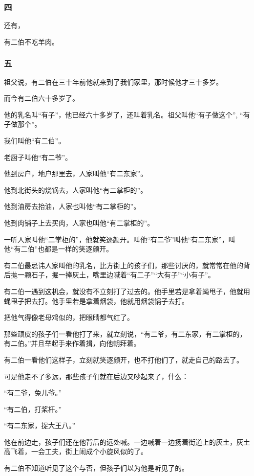 \subsubsection*{四}
\par 还有，
\par 有二伯不吃羊肉。
\subsubsection*{五}
\par 祖父说，有二伯在三十年前他就来到了我们家里，那时候他才三十多岁。
\par 而今有二伯六十多岁了。
\par 他的乳名叫“有子”，他已经六十多岁了，还叫着乳名。祖父叫他“有子做这个”, “有子做那个”。
\par 我们叫他“有二伯”。
\par 老厨子叫他“有二爷”。
\par 他到房户，地户那里去，人家叫他“有二东家”。
\par 他到北街头的烧锅去，人家叫他“有二掌柜的”。
\par 他到油房去抬油，人家也叫他“有二掌柜的”。
\par 他到肉铺子上去买肉，人家也叫他“有二掌柜的”。
\par 一听人家叫他“二掌柜的”，他就笑逐颜开。叫他“有二爷”叫他“有二东家”，叫他“有二伯”也都是一样的笑逐颜开。
\par 有二伯最忌讳人家叫他的乳名，比方街上的孩子们，那些讨厌的，就常常在他的背后抛一颗石子，掘一捧灰土，嘴里边喊着“有二子”“大有子”“小有子”。
\par 有二伯一遇到这机会，就没有不立刻打了过去的。他手里若是拿着蝇甩子，他就用蝇甩子把去打。他手里若是拿着烟袋，他就用烟袋锅子去打。
\par 把他气得像老母鸡似的，把眼睛都气红了。
\par 那些顽皮的孩子们一看他打了来，就立刻说，“有二爷，有二东家，有二掌柜的，有二伯。”并且举起手来作着揖，向他朝拜着。
\par 有二伯一看他们这样子，立刻就笑逐颜开，也不打他们了，就走自己的路去了。
\par 可是他走不了多远，那些孩子们就在后边又吵起来了，什么：
\par “有二爷，兔儿爷。”
\par “有二伯，打桨杆。”
\par “有二东家，捉大王八。”
\par 他在前边走，孩子们还在他背后的远处喊。一边喊着一边扬着街道上的灰土，灰土高飞着，一会工夫，街上闹成个小旋风似的了。
\par 有二伯不知道听见了这个与否，但孩子们以为他是听见了的。
